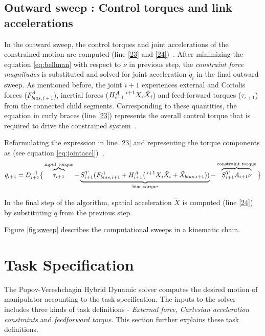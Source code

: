 \subsection{Outward sweep : Control torques and link accelerations}
In the outward sweep, the control torques and joint accelerations of the constrained motion are computed (line \ref{23} and \ref{24})~\cite{shakhimardanov2015composable}. After minimizing the equation \ref{eq:bellman} with respect to $\nu$ in previous step, the \textit{constraint force magnitudes} is substituted and solved for joint acceleration $\ddot{q}_i$ in the final outward sweep. As mentioned before, the joint $i+1$ experiences external and Coriolis forces ($F_{bias, i+1}^A$), inertial forces ($H_{i+1}^A\prescript{i+1}{}{X}_i \ddot{X}_i$) and feed-forward torques ($\tau_{i+1}$) from the connected child segments. Corresponding to these quantities, the equation in curly braces (line \ref{23}) represents the overall control torque that is required to drive the constrained system~\cite{vukcevic2018extending}.

Reformulating the expression in line \ref{23} and representing the torque components as (see equation \ref{eq:jointaccl})~\cite{vukcevic2018extending},
\begin{equation}\label{eq:jointaccl}
	\ddot{q}_{i+1} = D_{i+1}^{-1} \big\{ \overbrace{\strut \tau_{i+1}}^\text{input torque} - \underbrace{ \strut S_{i+1}^T \big(F_{bias, i+1}^A + H_{i+1}^A \big(\prescript{i+1}{}{X}_i \ddot{X}_i + \ddot{X}_{bias, i+1}))}_\text{bias torque} - \overbrace{\strut S_{i+1}^T A_{i+1} \nu}^\text{constraint torque} \big \}
\end{equation}

In the final step of the algorithm, spatial acceleration $\ddot{X}$ is computed (line \ref{24}) by substituting $\ddot{q}$ from the previous step. 

Figure \ref{fig:sweep} describes the computational sweeps in a kinematic chain.


\section{Task Specification}

The Popov-Vereshchagin Hybrid Dynamic solver computes the desired motion of manipulator accounting to the task specification. The inputs to the solver includes three kinds of task definitions - \textit{External force}, \textit{Cartesian acceleration constraints} and \textit{feedforward torque}. This section further explains these task definitions.

